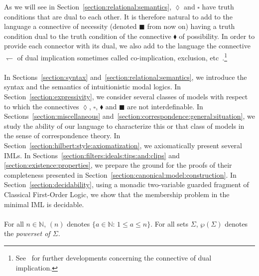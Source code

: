 \documentclass[draft]{article}
\def\N{\mathbb{N}}
\def\card{\mathtt{Card}}
\begin{document}
As we will see in Section~\ref{section:relational:semantics}, $\lozenge$ and $\square$ have truth conditions that are dual to each other.
It is therefore natural to add to the language a connective of necessity (denoted $\blacksquare$ from now on) having a truth condition dual to the truth condition of the connective $\blacklozenge$ of possibility.
In order to provide each connector with its dual, we also add to the language the connective $\leftharpoondown$ of dual implication sometimes called co-implication, exclusion, etc~\cite{Rauszer:1980}.\footnote{See~\cite{Gore:Shillito:2020,Wolter:1998a} for further developments concerning the connective of dual implication.}
%
%
\\
\\
%
%
In Sections~\ref{section:syntax} and~\ref{section:relational:semantics}, we introduce the syntax and the semantics of intuitionistic modal logics.
In Section~\ref{section:expressivity}, we consider several classes of models with respect to which the connectives $\lozenge$, $\square$, $\blacklozenge$ and $\blacksquare$ are not interdefinable.
In Sections~\ref{section:miscellaneous} and~\ref{section:correspondence:general:situation}, we study the ability of our language to characterize this or that class of models in the sense of correspondence theory.
In Section~\ref{section:hilbert:style:axiomatization}, we axiomatically present several IMLs.
In Sections~\ref{section:filters:ideals:tips:and:clips} and \ref{section:existence:properties}, we prepare the ground for the proofs of their completeness presented in Section~\ref{section:canonical:model:construction}.
In Section~\ref{section:decidability}, using a monadic two-variable guarded fragment of Classical First-Order Logic, we show that the membership problem in the minimal IML is decidable.
%
%
\\
\\
%
%
For all $n{\in}\N$, $(n)$ denotes $\{a{\in}\N$: $1{\leq}a{\leq}n\}$.
For all sets $\Sigma$, $\wp(\Sigma)$ denotes the {\em powerset of $\Sigma$.}
\end{document}
